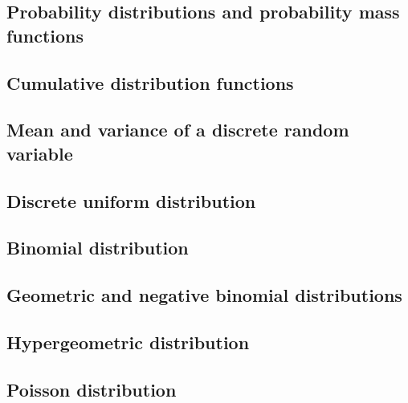 \documentclass[10pt, twocolumn]{article}
\begin{document}
\subsection{Probability distributions and probability mass functions}



\subsection{Cumulative distribution functions}



\subsection{Mean and variance of a discrete random variable}



\subsection{Discrete uniform distribution}



\subsection{Binomial distribution}



\subsection{Geometric and negative binomial distributions}



\subsection{Hypergeometric distribution}



\subsection{Poisson distribution}
\end{document}
